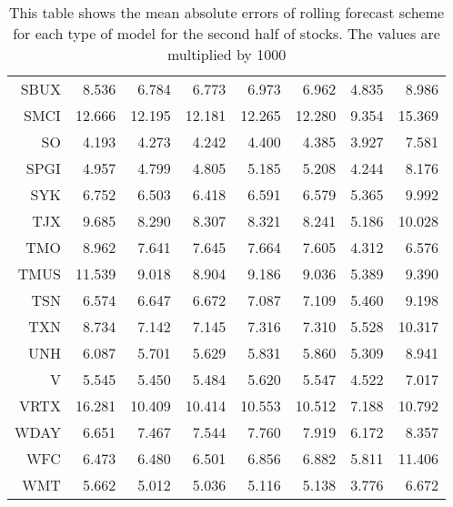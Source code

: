 \begin{table}[ht]
\begin{tabular}{rrrrrrrr}
  SBUX & 8.536 & 6.784 & 6.773 & 6.973 & 6.962 & 4.835 & 8.986 \\ 
  SMCI & 12.666 & 12.195 & 12.181 & 12.265 & 12.280 & 9.354 & 15.369 \\ 
  SO & 4.193 & 4.273 & 4.242 & 4.400 & 4.385 & 3.927 & 7.581 \\ 
  SPGI & 4.957 & 4.799 & 4.805 & 5.185 & 5.208 & 4.244 & 8.176 \\ 
  SYK & 6.752 & 6.503 & 6.418 & 6.591 & 6.579 & 5.365 & 9.992 \\ 
  TJX & 9.685 & 8.290 & 8.307 & 8.321 & 8.241 & 5.186 & 10.028 \\ 
  TMO & 8.962 & 7.641 & 7.645 & 7.664 & 7.605 & 4.312 & 6.576 \\ 
  TMUS & 11.539 & 9.018 & 8.904 & 9.186 & 9.036 & 5.389 & 9.390 \\ 
  TSN & 6.574 & 6.647 & 6.672 & 7.087 & 7.109 & 5.460 & 9.198 \\ 
  TXN & 8.734 & 7.142 & 7.145 & 7.316 & 7.310 & 5.528 & 10.317 \\ 
  UNH & 6.087 & 5.701 & 5.629 & 5.831 & 5.860 & 5.309 & 8.941 \\ 
  V & 5.545 & 5.450 & 5.484 & 5.620 & 5.547 & 4.522 & 7.017 \\ 
  VRTX & 16.281 & 10.409 & 10.414 & 10.553 & 10.512 & 7.188 & 10.792 \\ 
  WDAY & 6.651 & 7.467 & 7.544 & 7.760 & 7.919 & 6.172 & 8.357 \\ 
  WFC & 6.473 & 6.480 & 6.501 & 6.856 & 6.882 & 5.811 & 11.406 \\ 
  WMT & 5.662 & 5.012 & 5.036 & 5.116 & 5.138 & 3.776 & 6.672 \\ 
   \hline
\end{tabular}
\caption[MAE rolling forecast (2)]{This table shows the mean absolute errors of rolling forecast scheme for each type of model for the second half of stocks. 
                     The values are multiplied by 1000} 
\label{Table:MAE_r_2}
\end{table}

